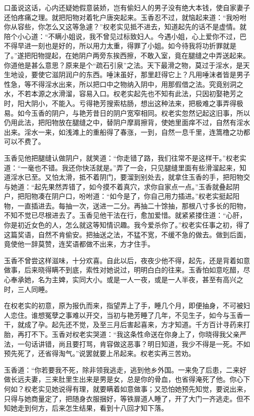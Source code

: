 \documentclass[a4paper,12pt,UTF8,twoside]{ctexbook}
\begin{document}
口虽说这话，心内还疑她假意装娇，岂有偷妇人的男子没有绝大本钱，使自家妻子还怕疼痛之理。就把阳物对着牝户唐突起来。玉香忍不过，就恼起来道：“我吩咐你从容些，你怎么又这等急遽？”权老实见抵不进去，知道起先的话不是虚情。就陪个小心道：“不瞒小姐说，我不曾见过标致妇人。今遇小姐，心上爱你不过，巴不得早进一刻也是好的，所以用力太重，得罪了小姐。如今待我将功折罪就是了。”遂把阳物提起，在她阴户两旁东挨西擦，不敢入室，竟在腿缝之中弄送起来。你道他是甚么意思？原来是个“疏石引泉”之法。天下最滑之物，莫过于淫水，是天生地设，要使它滋阴润户的东西。唾沫虽好，那里赶得它上？凡用唾沫者皆是男子性急，等不得淫水出来，所以把口中之物纳入阴中，用那假借之法。究竟别洞之水，不若本源之水滑溜，容易入口。权老实起先也不知有此法，只因初娶艳芳之时，阳大阴小，不能入。亏得艳芳搜索枯肠，想出这种法来，把极难之事弄得极易。如今玉香的阴户，与艳芳昔日的阴户宽窄相同。权老实忽然记起这旧事，所以仍用此法，把阳物放在腿缝之中，替阴户摩肩擦背，使她里面痒不过，自然有淫水出来。淫水一来，如浅滩上的重船得了春涨，一到，自然一息千里，连篙橹之功都可以不费了。

玉香见他把腿缝认做阴户，就笑道：“你走错了路，我们往常不是这样干。”权老实道：“一毫也不错。我还你快活就是。”弄了一会，只见腿缝里面有些滑溜起来，知道淫水已至。又怕太滑，抵不着阴门，要溜到别处去，就拿住玉香的手，把阳物交与她道：“起先果然弄错了，如今摸不着真穴，求你自家点一点。”玉香就叠起阴户，把阳物凑在阴户口，吩咐道：“如今是了，你自己用力插进。”权老实挺起阳物，一直插进去。每抽一次，送进一二分。再抽二十馀抽，那根八寸多长的阳物，不知不觉已尽根进去了。玉香见他干法在行，愈加爱惜。就紧紧搂住道：“心肝，你是初近女色的人，怎么就这等知情识趣。我今爱杀你了。”权老实任事之初，得了这篇奖语，自然不肯偷安。把抽送之法，不猛不宽，不缓不急的做去。做到后面，竟使他一辞莫赞，连奖语都做不出来，方才住手。

玉香不曾尝这样滋味，十分欢喜。自此以后，夜夜少他不得，起先，还是背着如意做事，后来晓得瞒不到底，索性对她说过，明明白白的往来。玉香怕如意吃醋，尽心奉承她，名为主婢，实同大小。或是一人一夜，或是一人半夜，甚至有高兴之时，三人同睡。

在权老实的初意，原为报仇而来，指望弄上了手，睡几个月，即便抽身，不可被妇人恋住。谁想冤孽之事难以开交，当初与艳芳睡了几年，不见生子，如今与玉香一干，就成了孕。起先还不觉，及至三月后害起喜来，方才知道。千方百计寻药来打胎，再打不下。玉香对权老实哭道：“我这条性命送在你身上了，你晓得我父亲严法，一句话讲错，尚且要打骂，肯容做这恶事？明日知道，我少不得是一死。不如预先死了，还省得淘气。”说罢就要上吊起来。权老实再三苦劝。

玉香道：“你若要我不死，除非领我逃走，逃到他乡外国。一来免了后患，二来好做长远夫妻，三来肚里生出来是男是女，总是你的骨血，也省得淹死了他。你心下何如？权老实见她说得有理，就要瞒着如意做事；又恐怕她预先知觉，要说出来，只得与她商量定了，把随身衣服捆好，等铁扉道人睡了，开了大门一齐逃走。但不知她走到何方，后来怎生结果，看到十八回才知下落。
\end{document}
